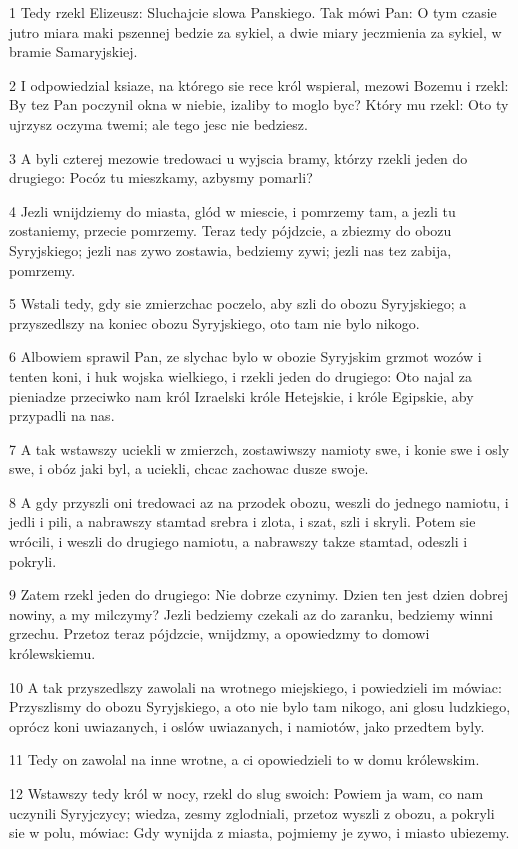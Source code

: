 \par 1 Tedy rzekl Elizeusz: Sluchajcie slowa Panskiego. Tak mówi Pan: O tym czasie jutro miara maki pszennej bedzie za sykiel, a dwie miary jeczmienia za sykiel, w bramie Samaryjskiej.
\par 2 I odpowiedzial ksiaze, na którego sie rece król wspieral, mezowi Bozemu i rzekl: By tez Pan poczynil okna w niebie, izaliby to moglo byc? Który mu rzekl: Oto ty ujrzysz oczyma twemi; ale tego jesc nie bedziesz.
\par 3 A byli czterej mezowie tredowaci u wyjscia bramy, którzy rzekli jeden do drugiego: Pocóz tu mieszkamy, azbysmy pomarli?
\par 4 Jezli wnijdziemy do miasta, glód w miescie, i pomrzemy tam, a jezli tu zostaniemy, przecie pomrzemy. Teraz tedy pójdzcie, a zbiezmy do obozu Syryjskiego; jezli nas zywo zostawia, bedziemy zywi; jezli nas tez zabija, pomrzemy.
\par 5 Wstali tedy, gdy sie zmierzchac poczelo, aby szli do obozu Syryjskiego; a przyszedlszy na koniec obozu Syryjskiego, oto tam nie bylo nikogo.
\par 6 Albowiem sprawil Pan, ze slychac bylo w obozie Syryjskim grzmot wozów i tenten koni, i huk wojska wielkiego, i rzekli jeden do drugiego: Oto najal za pieniadze przeciwko nam król Izraelski króle Hetejskie, i króle Egipskie, aby przypadli na nas.
\par 7 A tak wstawszy uciekli w zmierzch, zostawiwszy namioty swe, i konie swe i osly swe, i obóz jaki byl, a uciekli, chcac zachowac dusze swoje.
\par 8 A gdy przyszli oni tredowaci az na przodek obozu, weszli do jednego namiotu, i jedli i pili, a nabrawszy stamtad srebra i zlota, i szat, szli i skryli. Potem sie wrócili, i weszli do drugiego namiotu, a nabrawszy takze stamtad, odeszli i pokryli.
\par 9 Zatem rzekl jeden do drugiego: Nie dobrze czynimy. Dzien ten jest dzien dobrej nowiny, a my milczymy? Jezli bedziemy czekali az do zaranku, bedziemy winni grzechu. Przetoz teraz pójdzcie, wnijdzmy, a opowiedzmy to domowi królewskiemu.
\par 10 A tak przyszedlszy zawolali na wrotnego miejskiego, i powiedzieli im mówiac: Przyszlismy do obozu Syryjskiego, a oto nie bylo tam nikogo, ani glosu ludzkiego, oprócz koni uwiazanych, i oslów uwiazanych, i namiotów, jako przedtem byly.
\par 11 Tedy on zawolal na inne wrotne, a ci opowiedzieli to w domu królewskim.
\par 12 Wstawszy tedy król w nocy, rzekl do slug swoich: Powiem ja wam, co nam uczynili Syryjczycy; wiedza, zesmy zglodniali, przetoz wyszli z obozu, a pokryli sie w polu, mówiac: Gdy wynijda z miasta, pojmiemy je zywo, i miasto ubiezemy.
